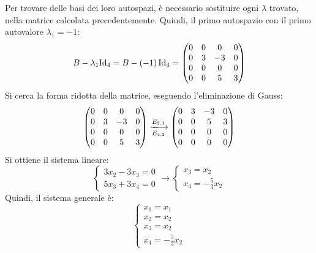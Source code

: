 \documentclass[a4paper]{article}
\makeatletter
\newenvironment{rowequmat}[1]{\left(\array{@{}#1@{}}}{\endarray\right)}
\makeatother
\begin{document}
	\noindent
	Per trovare delle basi dei loro autospazi, è necessario sostituire ogni $\lambda$ trovato, nella matrice calcolata precedentemente. Quindi, il primo autospazio con il primo autovalore $\lambda_{1} = -1$:
	\begin{equation*}
		B - \lambda_{1} \mathrm{Id}_{4} = B - \left(-1\right) \mathrm{Id}_{4} =
		\begin{rowequmat}{cccc}
				0	& 0		& 0		& 0 \\
				0	& 3		& -3	& 0 \\
				0	& 0		& 0		& 0 \\
				0	& 0		& 5		& 3
		\end{rowequmat}
	\end{equation*}
	Si cerca la forma ridotta della matrice, eseguendo l'eliminazione di Gauss:
	\begin{equation*}
		\begin{rowequmat}{cccc}
			0	& 0		& 0		& 0 \\
			0	& 3		& -3	& 0 \\
			0	& 0		& 0		& 0 \\
			0	& 0		& 5		& 3
		\end{rowequmat} \xlongrightarrow[E_{4,2}]{E_{2,1}}
		\begin{rowequmat}{cccc}
			0	& 3		& -3	& 0 \\
			0	& 0		& 5		& 3 \\
			0	& 0		& 0		& 0 \\
			0	& 0		& 0		& 0 
		\end{rowequmat}
	\end{equation*}
	Si ottiene il sistema lineare:
	\begin{equation*}
		\begin{cases}
			3x_{2} -3x_{3} = 0 \\
			5x_{3} +3x_{4} = 0	
		\end{cases}
		\longrightarrow
		\begin{cases}
			x_{3} = x_{2} \\
			x_{4} = -\frac{5}{3}x_{2}
		\end{cases}
	\end{equation*}
	Quindi, il sistema generale è:
	\begin{equation*}
		\begin{cases}
			x_{1} = x_{1} \\
			x_{2} = x_{2} \\
			x_{3} = x_{2} \\
			x_{4} = -\frac{5}{3}x_{2}
		\end{cases}
	\end{equation*}
\end{document}
